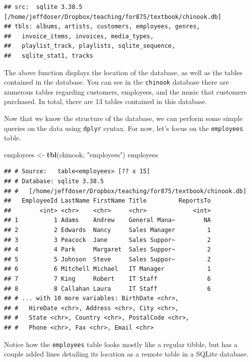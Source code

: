 \documentclass[
]{krantz}
\newenvironment{Shaded}{\begin{snugshade}}{\end{snugshade}}
\newcommand{\KeywordTok}[1]{\textcolor[rgb]{0.13,0.29,0.53}{\textbf{#1}}}
\newcommand{\NormalTok}[1]{#1}
\newcommand{\StringTok}[1]{\textcolor[rgb]{0.31,0.60,0.02}{#1}}
\begin{document}
\begin{verbatim}
## src:  sqlite 3.38.5 [/home/jeffdoser/Dropbox/teaching/for875/textbook/chinook.db]
## tbls: albums, artists, customers, employees, genres,
##   invoice_items, invoices, media_types,
##   playlist_track, playlists, sqlite_sequence,
##   sqlite_stat1, tracks
\end{verbatim}

The above function displays the location of the database, as well as the tables contained in the database. You can see in the \texttt{chinook} database there are numerous tables regarding customers, employees, and the music that customers purchased. In total, there are 13 tables contained in this database.

Now that we know the structure of the database, we can perform some simple queries on the data using \texttt{dplyr} syntax. For now, let's focus on the \texttt{employees} table.

\begin{Shaded}
\begin{Highlighting}[]
\NormalTok{employees \textless{}{-}}\StringTok{ }\KeywordTok{tbl}\NormalTok{(chinook, }\StringTok{"employees"}\NormalTok{)}
\NormalTok{employees}
\end{Highlighting}
\end{Shaded}

\begin{verbatim}
## # Source:   table<employees> [?? x 15]
## # Database: sqlite 3.38.5
## #   [/home/jeffdoser/Dropbox/teaching/for875/textbook/chinook.db]
##   EmployeeId LastName FirstName Title         ReportsTo
##        <int> <chr>    <chr>     <chr>             <int>
## 1          1 Adams    Andrew    General Mana~        NA
## 2          2 Edwards  Nancy     Sales Manager         1
## 3          3 Peacock  Jane      Sales Suppor~         2
## 4          4 Park     Margaret  Sales Suppor~         2
## 5          5 Johnson  Steve     Sales Suppor~         2
## 6          6 Mitchell Michael   IT Manager            1
## 7          7 King     Robert    IT Staff              6
## 8          8 Callahan Laura     IT Staff              6
## # ... with 10 more variables: BirthDate <chr>,
## #   HireDate <chr>, Address <chr>, City <chr>,
## #   State <chr>, Country <chr>, PostalCode <chr>,
## #   Phone <chr>, Fax <chr>, Email <chr>
\end{verbatim}

Notice how the \texttt{employees} table looks mostly like a regular tibble, but has a couple added lines detailing its location as a remote table in a SQLite database.
\end{document}
